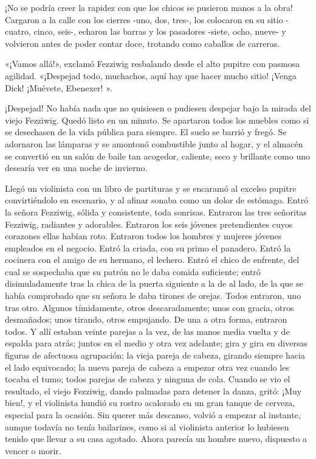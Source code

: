 \documentclass{novela}
\begin{document}
 ¡No se podría creer la rapidez con que los chicos se pusieron manos a la obra! Cargaron a la calle con los cierres -uno, dos, tres-, los colocaron en su sitio -cuatro, cinco, seis-, echaron las barras y los pasadores -siete, ocho, nueve- y volvieron antes de poder contar doce, trotando como caballos de carreras.

 «¡Vamos allá!», exclamó Fezziwig resbalando desde el alto pupitre con pasmosa agilidad. «¡Despejad todo, muchachos, aquí hay que hacer mucho sitio! ¡Venga Dick! ¡Muévete, Ebenexer! ».

 ¡Despejad! No había nada que no quisiesen o pudiesen despejar bajo la mirada del viejo Fezziwig. Quedó listo en un minuto. Se apartaron todos los muebles como si se desechasen de la vida pública para siempre. El suelo se barrió y fregó. Se adornaron las lámparas y se amontonó combustible junto al hogar, y el almacén se convertió en un salón de baile tan acogedor, caliente, seco y brillante como uno desearía ver en una noche de invierno.

 Llegó un violinista con un libro de partituras y se encaramó al excelso pupitre convirtiéndolo en escenario, y al afinar sonaba como un dolor de estómago. Entró la señora Fezziwig, sólida y consistente, toda sonrisas. Entraron las tres señoritas Fezziwig, radiantes y adorables. Entraron los seis jóvenes pretendientes cuyos corazones ellas habían roto. Entraron todos los hombres y mujeres jóvenes empleados en el negocio. Entró la criada, con su primo el panadero. Entró la cocinera con el amigo de su hermano, el lechero. Entró el chico de enfrente, del cual se sospechaba que su patrón no le daba comida suficiente; entró disimuladamente tras la chica de la puerta siguiente a la de al lado, de la que se había comprobado que su señora le daba tirones de orejas. Todos entraron, uno tras otro. Algunos tímidamente, otros descaradamente; unos con gracia, otros desmañados; unos tirando, otros empujando. De una a otra forma, entraron todos. Y allí estaban veinte parejas a la vez, de las manos media vuelta y de espalda para atrás; juntos en el medio y otra vez adelante; gira y gira en diversas figuras de afectuosa agrupación; la vieja pareja de cabeza, girando siempre hacia el lado equivocado; la nueva pareja de cabeza a empezar otra vez cuando les tocaba el tumo; todos parejas de cabeza y ninguna de cola. Cuando se vio el resultado, el viejo Fezziwig, dando palmadas para detener la danza, gritó: ¡Muy bien!, y el violinista hundió su rostro acalorado en un gran tanque de cerveza, especial para la ocasión. Sin querer más descanso, volvió a empezar al instante, aunque todavía no tenía bailarines, como si al violinista anterior lo hubiesen tenido que llevar a su casa agotado. Ahora parecía un hombre nuevo, dispuesto a vencer o morir.
\end{document}
